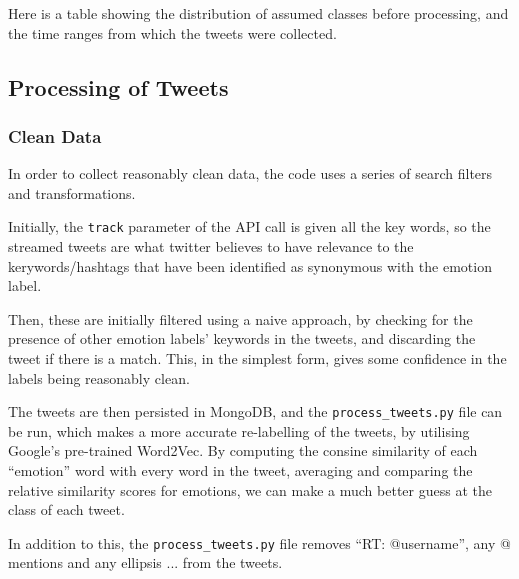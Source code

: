 \documentclass{mproj}
\begin{document}

Here is a table showing the distribution of assumed classes before processing, and the time ranges from which the tweets were collected.

{}

\subsection{Processing of Tweets}

\subsubsection{Clean Data}

In order to collect reasonably clean data, the code uses a series of search filters and transformations.

Initially, the \lstinline{track} parameter of the API call is given all the key words, so the streamed tweets are what twitter believes to have relevance to the kerywords/hashtags that have been identified as synonymous with the emotion label.

Then, these are initially filtered using a naive approach, by checking for the presence of other emotion labels' keywords in the tweets, and discarding the tweet if there is a match. This, in the simplest form, gives some confidence in the labels being reasonably clean.

The tweets are then persisted in MongoDB, and the \lstinline{process_tweets.py} file can be run, which makes a more accurate re-labelling of the tweets, by utilising Google's pre-trained Word2Vec. By computing the consine similarity of each ``emotion'' word with every word in the tweet, averaging and comparing the relative similarity scores for emotions, we can make a much better guess at the class of each tweet.

In addition to this, the \lstinline{process_tweets.py} file removes ``RT: @username'', any @ mentions and any ellipsis ... from the tweets.
\end{document}
